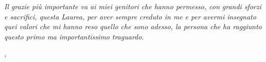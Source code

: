 \noindent \textit{Il grazie più importante va ai miei genitori che hanno permesso, con grandi sforzi e sacrifici, questa Laurea, per aver sempre creduto in me e per avermi insegnato quei valori che mi hanno reso quello che sono adesso, la persona che ha raggiunto questo primo ma importantissimo traguardo.}

\bigskip

\noindent\textit{\myLocation, \myTime}
\hfill \myName

\endgroup

